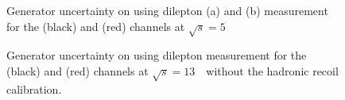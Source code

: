 \begin{figure}[h]
\centering
{}
\caption{Generator uncertainty on \ptz using dilepton \pt (a) and \ut (b) measurement for the \Zee (black) and \Zmm (red) channels at $\sqrt{s} = 5$~\TeV\  }
\label{fig:z_gen_unc_5}
\end{figure}

\begin{figure}[h]
\centering
{}
\caption{Generator uncertainty on \ptz using dilepton \pt measurement for the \Zee (black) and \Zmm (red) channels at $\sqrt{s} = 13$~\TeV\ without the hadronic recoil calibration. }
\label{fig:z_gen_unc_13_recoilOff}
\end{figure}
